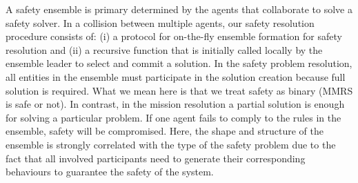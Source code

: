 \documentclass[journal]{IEEEtran}
\theoremstyle{definition}
\newcommand{\ugh}[1]{\textcolor{red}{\uwave{#1}}} %
\newcommand\patrizio[1]{\nb{Patrizio}{#1}}
\begin{document}
A safety ensemble is primary determined by the agents that collaborate to solve a safety solver. In a collision between multiple agents, our safety resolution procedure consists of: (i) a protocol for on-the-fly ensemble formation for safety resolution and (ii) a recursive function that is initially called locally by the ensemble leader to select and commit a solution. In the safety problem resolution, all entities in the ensemble must  participate in the solution creation because full solution is required. What we mean here is that we treat safety as binary (MMRS is safe or not). In contrast, in the mission resolution a partial solution is enough for solving a particular problem.
If one agent fails to comply to the rules in the ensemble, safety will be compromised. Here, the shape and structure of the ensemble is strongly correlated with the type of the safety problem due to the fact that all involved participants need to generate their corresponding behaviours to guarantee the safety of the system.


\end{document}
